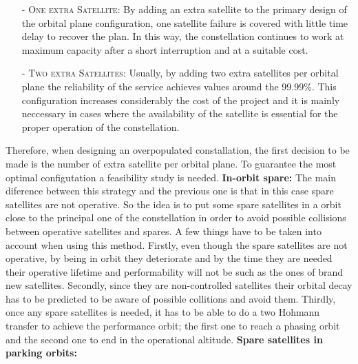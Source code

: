 \begin{itemize}
\item[-] \textsc{One extra Satellite:}
\newline
By adding an extra satellite to the primary design of the orbital plane configuration, one satellite failure is covered with little time delay to recover the plan. In this way, the constellation continues to work at maximum capacity after a short interruption and at a suitable cost. 
\item[-] \textsc{Two extra Satellites:}
\newline
Usually, by adding two extra satellites per orbital plane the reliability of the service achieves values around the 99.99\%. This configuration increases considerably the cost of the project and it is mainly neccessary in cases where the availability of the satellite is essential for the proper operation of the constellation.
\end{itemize}
Therefore, when designing an overpopulated constallation, the first decision to be made is the number of extra satellite per orbital plane. To guarantee the most optimal configutation a feasibility study is needed.  
\newline
\newline
\textbf{In-orbit spare:}
\newline
The main diference between this strategy and the previous one is that in this case spare satellites are not operative. So the idea is to put some spare satellites in a orbit close to the principal one of the constellation in order to avoid possible collisions between operative satellites and spares. 
\newline
\newline
A few things have to be taken into account when using this method. Firstly, even though the spare satellites are not operative, by being in orbit they deteriorate and by the time they are needed their operative lifetime and performability will not be such as the ones of brand new satellites. Secondly, since they are non-controlled satellites their orbital decay has to be predicted to be aware of possible collitions and avoid them. Thirdly, once any spare satellites is needed, it has to be able to do a two Hohmann transfer to achieve the performance orbit; the first one to reach a phasing orbit and the second one to end in the operational altitude.
\newline
\newline
\textbf{Spare satellites in parking orbits:}
\newline
